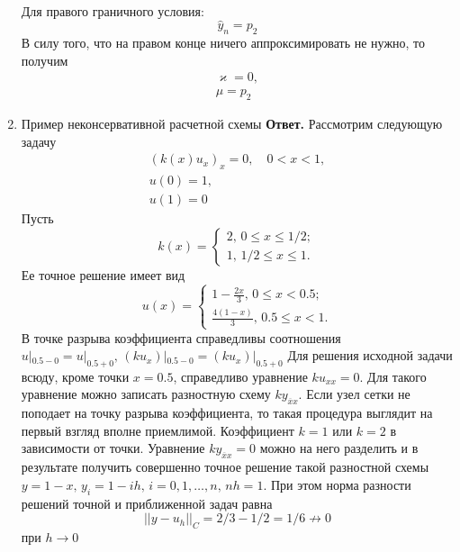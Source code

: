 \documentclass{article}
\begin{document}
\begin{enumerate}
\begin{gather*}
	\end{gather*}
	Для правого граничного условия:
	\begin{equation*}
		\hat{y}_{n} = p_2
	\end{equation*}
	В силу того, что на правом конце ничего аппроксимировать не нужно, то получим
	\begin{gather*}
		\varkappa = 0, \\
		\mu = p_2
	\end{gather*}
	\item Пример неконсервативной расчетной схемы 
	\newline 
	{\bfseries Ответ. } Рассмотрим следующую задачу 
	\begin{gather*}
		(k(x)u_x)_x = 0, \quad 0<x<1, \\
		u(0) = 1, \\ 
		u(1) = 0
	\end{gather*}
	Пусть 
	\[
	k(x) = \begin{cases}
		2, \, 0 \leqslant x \le 1/2; \\ 
		1, \, 1/2 \leqslant x \le 1.
	\end{cases}
	\]
	Ее точное решение имеет вид
	\[
	u(x) = 
		\begin{cases}
			1-\frac{2x}{3}, \, 0 \le x < 0.5; \\ 
			\frac{4(1-x)}{3}, \, 0.5 \le x < 1.
		\end{cases}
	\]
	В точке разрыва коэффициента справедливы соотношения 
	$u |_{0.5-0} = u |_{0.5+0},
	\, (ku_x)|_{0.5-0} = (ku_x)|_{0.5+0}$
	Для решения исходной задачи всюду, кроме точки $x = 0.5$, 
	справедливо уравнение $ku_{xx} =0$. 
	Для такого уравнение можно записать разностную схему $ky_{\overline{x}x}$.
	Если узел сетки не поподает на точку разрыва коэффициента, то такая
	процедура выглядит на первый взгляд вполне приемлимой.
	Коэффициент $k=1$ или $k=2$ в зависимости от точки.
	Уравнение $ky_{\overline{x}x}=0$ можно на него разделить
	и в результате получить совершенно точное решение такой
	разностной схемы $y=1-x, \, y_i = 1-ih,\, i=0,1, \ldots, n, \, nh = 1$.
	При этом норма разности решений точной и приближенной задач равна
	\[
	||y-u_h||_C = 2/3 - 1/2 = 1/6 \not\rightarrow 0 
	\]
	при $h \rightarrow 0$
\end{enumerate}
\end{document}
